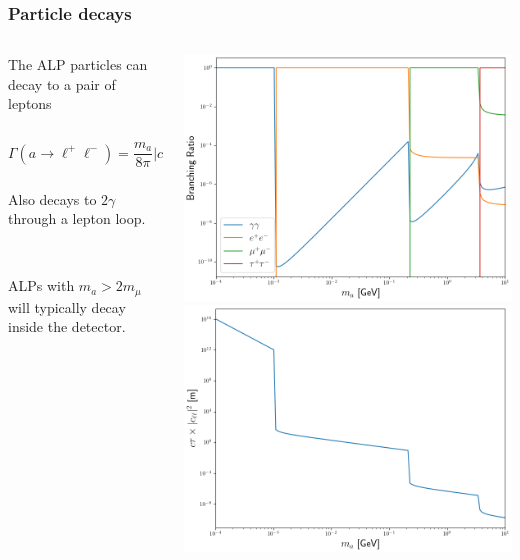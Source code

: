 \documentclass[mathserif, 10pt, aspectratio=169]{beamer}
\begin{document}
\begin{frame}\frametitle{Particle decays}
    
    \begin{columns}

        \begin{column}{0.6\textwidth}
            The ALP particles can decay to a pair of leptons

            $$\Gamma(a \to \ell^+\ell^-) = \frac{m_a}{8\pi} |c_{\ell\ell}|^2\frac{m_\ell^2}{f_a^2} \left(1-\frac{4 m_\ell^2}{m_a^2}\right)^{1/2}\,,$$

            Also decays to $2\gamma$ through a lepton loop.

            ~

            ALPs with $m_a > 2 m_\mu$ will typically decay inside the detector.
        \end{column}
        \begin{column}{0.36\textwidth}
            \includegraphics[width=\columnwidth]{figures/BR.png} \\
            \includegraphics[width=\columnwidth]{figures/decaylength.png}
        \end{column}
    \end{columns}
\end{frame}
\end{document}
